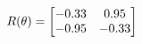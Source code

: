 \documentclass[preview]{standalone}
\begin{document}
\begin{align*}
\special{dvisvgm:raw <g id='unique000'>}R(\theta) = \begin{bmatrix}-0.33 & 0.95\\-0.95 & -0.33\end{bmatrix}\special{dvisvgm:raw </g>}
\end{align*}
\end{document}
